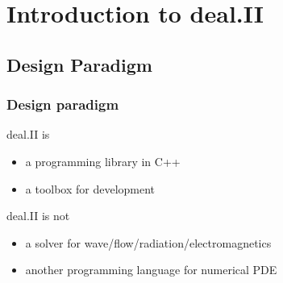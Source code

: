 \section{Introduction to deal.II}
\subsection{Design Paradigm}

\begin{frame}
  \frametitle{Design paradigm}
  deal.II is
  \begin{itemize}
  \item a programming library in C++
  \item a toolbox for development
  \end{itemize}
  \pause
  deal.II is not
  \begin{itemize}
  \item a solver for wave/flow/radiation/electromagnetics
  \item another programming language for numerical PDE
  \end{itemize}
\end{frame}

